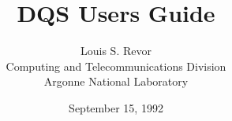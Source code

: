 \def\achilles{Sun4/490}
\def\qsub{\mbox{\it qsub}\ }
\def\qstat{\mbox{\it qstat}\ }
\def\group{\mbox{\it group}\ }
\def\queue{\mbox{\it queue}\ }
\def\queues{\mbox{\it queues}\ }
\def\qmaster{\mbox{\it qmaster}\ }
\def\pvm{PVM}

\title{DQS Users Guide}
\author{Louis S. Revor \\
        Computing and Telecommunications Division \\ Argonne National
        Laboratory}
\date{September 15, 1992}
\maketitle
\newpage









